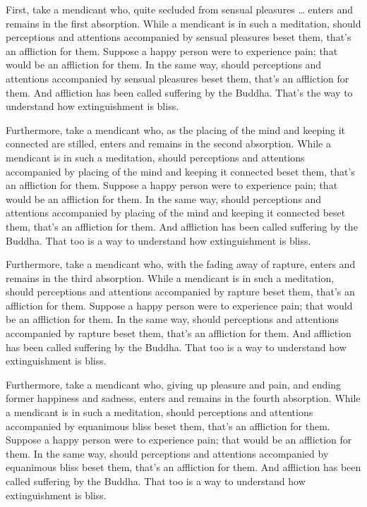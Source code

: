 \documentclass[12pt,openany]{book}%
\begin{document}
First, take a mendicant who, quite secluded from sensual pleasures … enters and remains in the first absorption. While a mendicant is in such a meditation, should perceptions and attentions accompanied by sensual pleasures beset them, that’s an affliction for them. Suppose a happy person were to experience pain; that would be an affliction for them. In the same way, should perceptions and attentions accompanied by sensual pleasures beset them, that’s an affliction for them. And affliction has been called suffering by the Buddha. That’s the way to understand how extinguishment is bliss. 

Furthermore, take a mendicant who, as the placing of the mind and keeping it connected are stilled, enters and remains in the second absorption. While a mendicant is in such a meditation, should perceptions and attentions accompanied by placing of the mind and keeping it connected beset them, that’s an affliction for them. Suppose a happy person were to experience pain; that would be an affliction for them. In the same way, should perceptions and attentions accompanied by placing of the mind and keeping it connected beset them, that’s an affliction for them. And affliction has been called suffering by the Buddha. That too is a way to understand how extinguishment is bliss. 

Furthermore, take a mendicant who, with the fading away of rapture, enters and remains in the third absorption. While a mendicant is in such a meditation, should perceptions and attentions accompanied by rapture beset them, that’s an affliction for them. Suppose a happy person were to experience pain; that would be an affliction for them. In the same way, should perceptions and attentions accompanied by rapture beset them, that’s an affliction for them. And affliction has been called suffering by the Buddha. That too is a way to understand how extinguishment is bliss. 

Furthermore, take a mendicant who, giving up pleasure and pain, and ending former happiness and sadness, enters and remains in the fourth absorption. While a mendicant is in such a meditation, should perceptions and attentions accompanied by equanimous bliss beset them, that’s an affliction for them. Suppose a happy person were to experience pain; that would be an affliction for them. In the same way, should perceptions and attentions accompanied by equanimous bliss beset them, that’s an affliction for them. And affliction has been called suffering by the Buddha. That too is a way to understand how extinguishment is bliss. 
\end{document}
